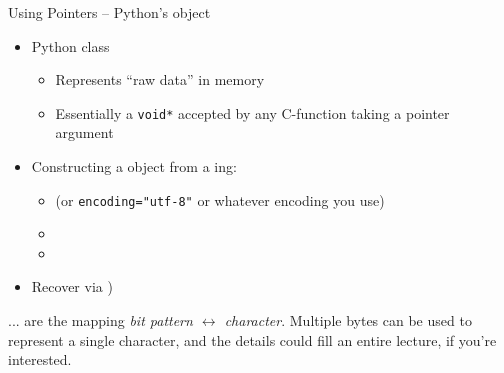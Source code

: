 \begin{frame}{Using Pointers -- Python's  object}
%
\begin{itemize}
\item Python class 
	\begin{itemize}
	\item Represents \enquote{raw data} in memory
	\item Essentially a \texttt{void*} \Thus accepted by any C-function taking a pointer argument
	\end{itemize}
\item Constructing a  object from a ing:
	\begin{itemize}
	\item {} (or \texttt{encoding="utf-8"} or whatever encoding you use)
	\item {}
	\item {}
	\end{itemize}
	\item Recover via )
\end{itemize}
%
\begin{hintbox}[Encodings]
\footnotesize
... are the mapping \emph{bit pattern $\leftrightarrow$ character}. Multiple bytes can be used to represent a single character, and the details could fill an entire lecture, if you're interested.
\end{hintbox}
%
\end{frame}


